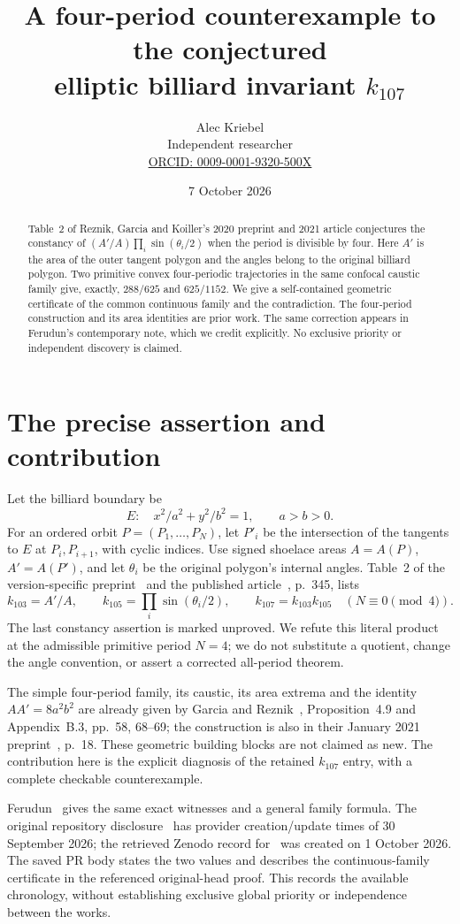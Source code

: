 \documentclass[11pt]{article}
\title{A four-period counterexample to the conjectured\\elliptic billiard invariant \(k_{107}\)}
\author{Alec Kriebel\\
\small Independent researcher\\
\small \href{https://orcid.org/0009-0001-9320-500X}{ORCID: 0009-0001-9320-500X}}
\date{7 October 2026}
\begin{document}
\maketitle
\begin{abstract}
Table~2 of Reznik, Garcia and Koiller's 2020 preprint and 2021 article conjectures the constancy of
\((A'/A)\prod_i\sin(\theta_i/2)\) when the period is divisible by four.
Here \(A'\) is the area of the outer tangent polygon and the angles belong to the original billiard polygon.
Two primitive convex four-periodic trajectories in the same confocal caustic family give, exactly,
\(288/625\) and \(625/1152\). We give a self-contained geometric certificate of the common continuous family and the contradiction.
The four-period construction and its area identities are prior work. The same correction appears in Ferudun's contemporary note, which we credit explicitly. No exclusive priority or independent discovery is claimed.
\end{abstract}

\section{The precise assertion and contribution}
Let the billiard boundary be
\[
 E:\quad x^2/a^2+y^2/b^2=1,\qquad a>b>0.
\]
For an ordered orbit \(P=(P_1,\ldots,P_N)\), let \(P'_i\) be the intersection of the tangents to \(E\) at \(P_i,P_{i+1}\), with cyclic indices. Use signed shoelace areas \(A=A(P)\), \(A'=A(P')\), and let \(\theta_i\) be the original polygon's internal angles.
Table~2 of the version-specific preprint~\cite{preprint} and the published article~\cite{journal}, p.~345, lists
\[
 k_{103}=A'/A,\qquad k_{105}=\prod_i\sin(\theta_i/2),\qquad
 k_{107}=k_{103}k_{105}\quad (N\equiv0\pmod4).
\]
The last constancy assertion is marked unproved. We refute this literal product at the admissible primitive period \(N=4\); we do not substitute a quotient, change the angle convention, or assert a corrected all-period theorem.

The simple four-period family, its caustic, its area extrema and the identity \(AA'=8a^2b^2\) are already given by Garcia and Reznik~\cite{lowperiod}, Proposition~4.9 and Appendix~B.3, pp.~58, 68--69; the construction is also in their January 2021 preprint~\cite{lowpreprint}, p.~18. These geometric building blocks are not claimed as new. The contribution here is the explicit diagnosis of the retained \(k_{107}\) entry, with a complete checkable counterexample.

Ferudun~\cite{ferudun} gives the same exact witnesses and a general family formula. The original repository disclosure~\cite{originalpr} has provider creation/update times of 30 September 2026; the retrieved Zenodo record for~\cite{ferudun} was created on 1 October 2026. The saved PR body states the two values and describes the continuous-family certificate in the referenced original-head proof. This records the available chronology, without establishing exclusive global priority or independence between the works.
\end{document}
